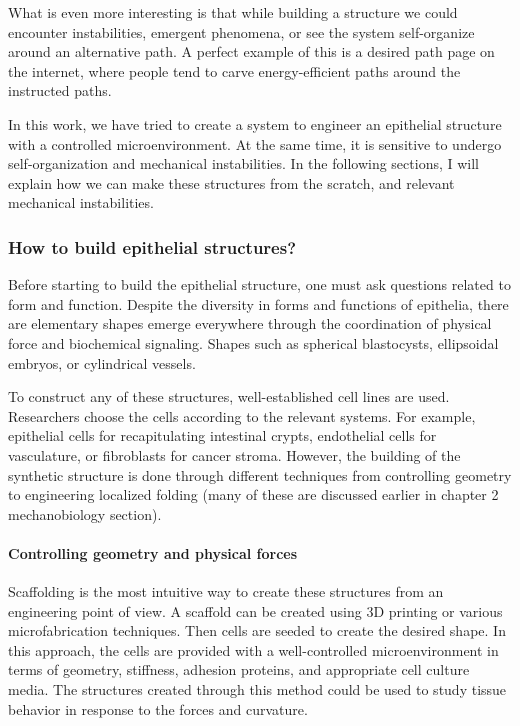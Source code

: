 \documentclass[
]{article}
\begin{document}
What is even more interesting is that while building a structure we
could encounter instabilities, emergent phenomena, or see the system
self-organize around an alternative path. A perfect example of this is a
desired path page on the internet, where people tend to carve
energy-efficient paths around the instructed paths.

In this work, we have tried to create a system to engineer an epithelial
structure with a controlled microenvironment. At the same time, it is
sensitive to undergo self-organization and mechanical instabilities. In
the following sections, I will explain how we can make these structures
from the scratch, and relevant mechanical instabilities.

\hypertarget{how-to-build-epithelial-structures}{%
\subsubsection{How to build epithelial
structures?}\label{how-to-build-epithelial-structures}}

Before starting to build the epithelial structure, one must ask
questions related to form and function. Despite the diversity in forms
and functions of epithelia, there are elementary shapes emerge
everywhere through the coordination of physical force and biochemical
signaling. Shapes such as spherical blastocysts, ellipsoidal embryos, or
cylindrical vessels.

To construct any of these structures, well-established cell lines are
used. Researchers choose the cells according to the relevant systems.
For example, epithelial cells for recapitulating intestinal crypts,
endothelial cells for vasculature, or fibroblasts for cancer stroma.
However, the building of the synthetic structure is done through
different techniques from controlling geometry to engineering localized
folding (many of these are discussed earlier in chapter 2 mechanobiology
section).

\hypertarget{controlling-geometry-and-physical-forces}{%
\paragraph{Controlling geometry and physical
forces}\label{controlling-geometry-and-physical-forces}}

Scaffolding is the most intuitive way to create these structures from an
engineering point of view. A scaffold can be created using 3D printing
or various microfabrication techniques. Then cells are seeded to create
the desired shape. In this approach, the cells are provided with a
well-controlled microenvironment in terms of geometry, stiffness,
adhesion proteins, and appropriate cell culture media. The structures
created through this method could be used to study tissue behavior in
response to the forces and curvature.
\end{document}
